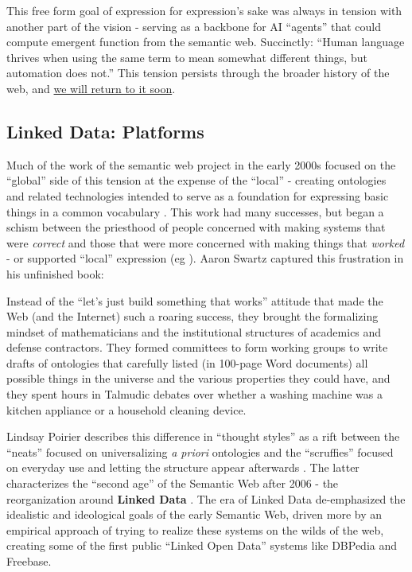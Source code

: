 This free form goal of expression for expression's sake was always in
tension with another part of the vision - serving as a backbone for AI
``agents'' that could compute emergent function from the semantic web.
Succinctly: ``Human language thrives when using the same term to mean
somewhat different things, but automation does not.'' \cite{berners-leeSemanticWeb2001}  This tension persists through the
broader history of the web, and
\protect\hyperlink{the-near-future-of-surveillance-capitalism-knowledge-graphs-get-chatbots}{we
will return to it soon}.

\hypertarget{linked-data-platforms}{%
\subsection{Linked Data: Platforms}\label{linked-data-platforms}}

Much of the work of the semantic web project in the early 2000s focused
on the ``global'' side of this tension at the expense of the ``local'' -
creating ontologies and related technologies intended to serve as a
foundation for expressing basic things in a common vocabulary \cite{hitzlerReviewSemanticWeb2021} . This work had many successes, but
began a schism between the priesthood of people concerned with making
systems that were \emph{correct} and those that were more concerned with
making things that \emph{worked} - or supported ``local'' expression (eg
\cite{palmerDitchingSemanticWeb2008} ). Aaron Swartz captured
this frustration in his unfinished book:

\begin{leftbar}
Instead of the ``let's just build something that works'' attitude that
made the Web (and the Internet) such a roaring success, they brought the
formalizing mindset of mathematicians and the institutional structures
of academics and defense contractors. They formed committees to form
working groups to write drafts of ontologies that carefully listed (in
100-page Word documents) all possible things in the universe and the
various properties they could have, and they spent hours in Talmudic
debates over whether a washing machine was a kitchen appliance or a
household cleaning device. \cite{swartzAaronSwartzProgrammable2013} 
\end{leftbar}

Lindsay Poirier describes this difference in ``thought styles'' as a
rift between the ``neats'' focused on universalizing \emph{a priori}
ontologies and the ``scruffies'' focused on everyday use and letting the
structure appear afterwards \cite{poirierTurnScruffyEthnographic2017} . The latter characterizes the ``second age'' of the Semantic Web
after 2006 - the reorganization around \textbf{Linked Data} \cite{berners-leeLinkedData2006, hitzlerReviewSemanticWeb2021} . The era of
Linked Data de-emphasized the idealistic and ideological goals of the
early Semantic Web, driven more by an empirical approach of trying to
realize these systems on the wilds of the web, creating some of the
first public ``Linked Open Data'' systems like DBPedia and Freebase.

